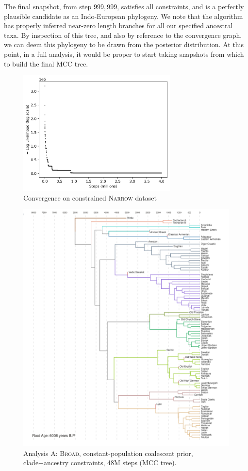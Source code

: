 \documentclass[10pt,journal,compsoc]{IEEEtran}
\begin{document}
The final snapshot, from step $999,999$, satisfies all constraints, and is a perfectly plausible candidate as an Indo-European phylogeny. We note that the algorithm has properly inferred near-zero length branches for all our specified ancestral taxa. By inspection of this tree, and also by reference to the convergence graph, we can deem this phylogeny to be drawn from the posterior distribution. At this point, in a full analysis, it would be proper to start taking snapshots from which to build the final MCC tree.

\begin{figure}
\caption{Convergence on constrained \textsc{Narrow} dataset}\label{fig:convergence}
\includegraphics[width=8cm,center]{convergence}
\end{figure}

\begin{figure}
    \caption{Analysis A: \textsc{Broad}, constant-population coalescent prior, clade+ancestry constraints, 48M steps (MCC tree).}\label{fig:analysisA}
    \includegraphics[width=\textwidth, center]{runs24-broad-constant}
\end{figure}
\end{document}
